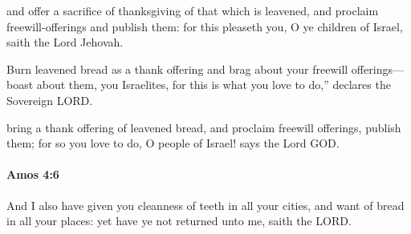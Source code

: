 			\begin{versebox}
					\item[BHS] 
					\item[LXX] 
					\item[ASV] and offer a sacrifice of thanksgiving of that which is leavened, and proclaim freewill-offerings and publish them: for this pleaseth you, O ye children of Israel, saith the Lord Jehovah.
					\item[NIV] Burn leavened bread as a thank offering and brag about your freewill offerings— boast about them, you Israelites, for this is what you love to do,” declares the Sovereign LORD.
					\item[NRSV] bring a thank offering of leavened bread, and proclaim freewill offerings, publish them; for so you love to do, O people of Israel! says the Lord GOD.
			\end{versebox}

		\paragraph{Amos 4:6} %
			\label{AMOS-4-6}

			And I also have given you cleanness of teeth in all your cities, and want of bread in all your places: yet have ye not returned unto me, saith the LORD.

